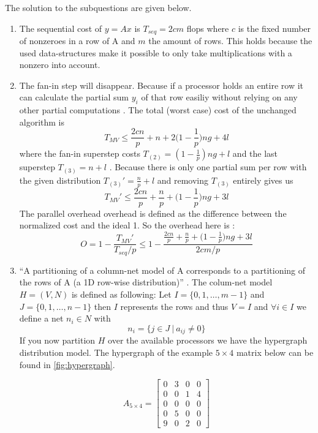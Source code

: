 \documentclass[../main.tex]{subfiles}
\begin{document}
\begin{solution} The solution to the subquestions are given below.
\begin{enumerate}
	\item The sequential cost of $y=Ax$ is $T_{seq} = 2cm$ flops \cite[p.~166]{bisseling04} where $c$ is the fixed number of nonzeroes in a row of A and $m$ the amount of rows. This holds because the used data-structures make it possible to only take multiplications with a nonzero into account.
	\item The fan-in step will disappear. Because if a processor holds an entire row it can calculate the partial sum $y_i$ of that row easiliy without relying on any other partial computations \cite[p.~176]{bisseling04}.  The total (worst case) cost of the unchanged algorithm is
	\begin{equation}
		T_{MV} \leq \frac{2cn}{p} + n + 2 \Big( 1 - \frac{1}{p} \Big) ng + 4l
	\end{equation}
			where the fan-in superstep costs $T_{(2)} = (1-\frac{1}{p})ng + l$ and the last superstep $T_{(3)} = n + l $ \cite[p.~178]{bisseling04}. Because there is only one partial sum per row with the given distribution $T_{(3)}' = \frac{n}{p} + l $ and removing $T_{(3)}$ entirely gives us
			\begin{equation}
				T_{MV}' \leq \frac{2cn}{p} + \frac{n}{p} + \Big(1 - \frac{1}{p} \Big) ng + 3l
			\end{equation}
			The parallel overhead overhead is defined as the difference between the normalized cost and the ideal 1. So the overhead here is \cite[p.~141]{bisseling04}:
			\begin{equation}
				O = 1 - \frac{T_{MV}'}{T_{seq}/p} \leq 1 - \frac{\frac{2cn}{p} + \frac{n}{p} + \Big(1 - \frac{1}{p} \Big) ng + 3l}{2cm/p}
			\end{equation}
	\item ``A partitioning of a column-net model of A corresponds to a partitioning of the rows of A (a 1D row-wise distribution)'' \cite{slides6}. The colum-net model $H=(V,N)$ is defined as following: Let $I = \{0,1,\ldots,m-1\}$ and $J = \{0,1,\ldots,n-1\}$ then $I$ represents the rows and thus $V = I$ and $\forall i \in I$ we define a net $n_i \in N$ with
	$$ n_i = \{j \in J ~|~ a_{ij} \neq 0\} $$
	If you now partition $H$ over the available processors we have the hypergraph distribution model. The hypergraph of the example $5 \times 4$ matrix below can be found in \autoref{fig:hypergraph}.

		\begin{equation}
			A_{5\times4} = \begin{bmatrix}
			0 & 3 & 0 & 0 \\
			0 & 0 & 1 & 4 \\
			0 & 0 & 0 & 0 \\
			0 & 5 & 0 & 0 \\
			9 & 0 & 2 & 0
			\end{bmatrix}
		\end{equation}


\end{enumerate}
\end{solution}
\end{document}
